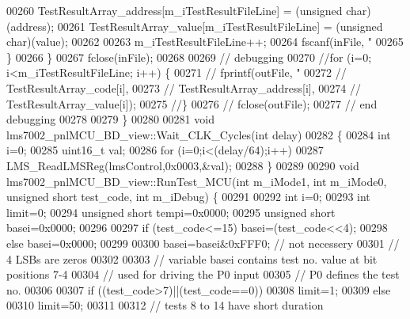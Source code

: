 \begin{DoxyCode}
{{{{{00260             TestResultArray_address[m_iTestResultFileLine] = (\textcolor{keywordtype}{unsigned} char)(address);
00261             TestResultArray_value[m_iTestResultFileLine] = (\textcolor{keywordtype}{unsigned} char)(value);
00262 
00263             m_iTestResultFileLine++;
00264             fscanf(inFile, \textcolor{stringliteral}{"%
00265         \}
00266     \}
00267     fclose(inFile);
00268 
00269     \textcolor{comment}{// debugging}
00270     \textcolor{comment}{//for (i=0; i<m\_iTestResultFileLine; i++) \{}
00271     \textcolor{comment}{//  fprintf(outFile, "%
00272     \textcolor{comment}{//          TestResultArray\_code[i],}
00273     \textcolor{comment}{//          TestResultArray\_address[i],}
00274     \textcolor{comment}{//          TestResultArray\_value[i]);}
00275     \textcolor{comment}{//\}}
00276     \textcolor{comment}{// fclose(outFile);}
00277     \textcolor{comment}{// end debugging}
00278 
00279 \}
00280 
00281 \textcolor{keywordtype}{void} lms7002_pnlMCU_BD_view::Wait_CLK_Cycles(\textcolor{keywordtype}{int} delay)
00282 \{
00284     \textcolor{keywordtype}{int} i=0;
00285     uint16\_t val;
00286     \textcolor{keywordflow}{for} (i=0;i<(delay/64);i++)
00287        LMS_ReadLMSReg(lmsControl,0x0003,&val);
00288 \}
00289 
00290 \textcolor{keywordtype}{void} lms7002_pnlMCU_BD_view::RunTest_MCU(\textcolor{keywordtype}{int} m_iMode1, \textcolor{keywordtype}{int} m_iMode0, \textcolor{keywordtype}{unsigned} \textcolor{keywordtype}{short} test\_code, \textcolor{keywordtype}{int} 
      m_iDebug) \{
00291 
00292     \textcolor{keywordtype}{int} i=0;
00293     \textcolor{keywordtype}{int} limit=0;
00294     \textcolor{keywordtype}{unsigned} \textcolor{keywordtype}{short} tempi=0x0000;
00295     \textcolor{keywordtype}{unsigned} \textcolor{keywordtype}{short} basei=0x0000;
00296 
00297     \textcolor{keywordflow}{if}  (test\_code<=15) basei=(test\_code<<4);
00298     \textcolor{keywordflow}{else} basei=0x0000;
00299 
00300     basei=basei&0xFFF0; \textcolor{comment}{// not necessery}
00301     \textcolor{comment}{// 4 LSBs are zeros}
00302 
00303     \textcolor{comment}{// variable basei contains test no. value at bit positions 7-4}
00304     \textcolor{comment}{// used for driving the P0 input}
00305     \textcolor{comment}{// P0 defines the test no.}
00306 
00307     \textcolor{keywordflow}{if} ((test\_code>7)||(test\_code==0))
00308         limit=1;
00309     \textcolor{keywordflow}{else}
00310         limit=50;
00311 
00312     \textcolor{comment}{// tests 8 to 14 have short duration}
}}}}}}}
\end{DoxyCode}
